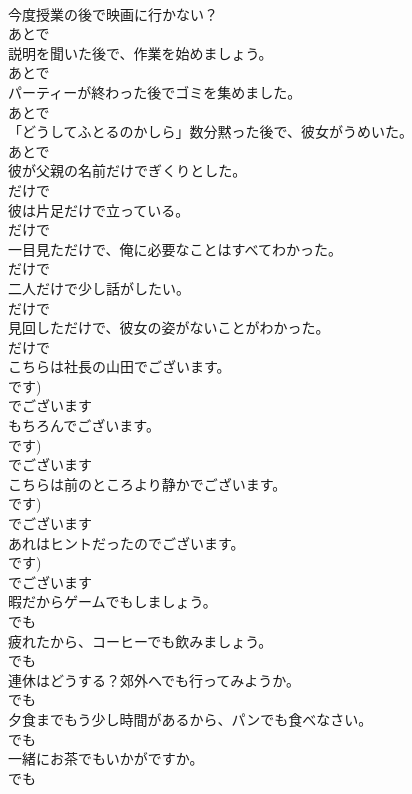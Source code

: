 \documentclass[8pt]{extreport}
\begin{document}
\begin{CJK}{UTF8}{min}
\\	今度授業の後で映画に行かない？	
\\	あとで	
\\	説明を聞いた後で、作業を始めましょう。	
\\	あとで	
\\	パーティーが終わった後でゴミを集めました。	
\\	あとで	
\\	「どうしてふとるのかしら」数分黙った後で、彼女がうめいた。	
\\	あとで	
\\	彼が父親の名前だけでぎくりとした。	
\\	だけで	
\\	彼は片足だけで立っている。	
\\	だけで	
\\	一目見ただけで、俺に必要なことはすべてわかった。	
\\	だけで	
\\	二人だけで少し話がしたい。	
\\	だけで	
\\	見回しただけで、彼女の姿がないことがわかった。	
\\	だけで	
\\	こちらは社長の山田でございます。	
\\	です)	
\\	でございます	
\\	もちろんでございます。	
\\	です)	
\\	でございます	
\\	こちらは前のところより静かでございます。	
\\	です)	
\\	でございます	
\\	あれはヒントだったのでございます。	
\\	です)	
\\	でございます	
\\	暇だからゲームでもしましょう。	
\\	でも	
\\	疲れたから、コーヒーでも飲みましょう。	
\\	でも	
\\	連休はどうする？郊外へでも行ってみようか。	
\\	でも	
\\	夕食までもう少し時間があるから、パンでも食べなさい。	
\\	でも	
\\	一緒にお茶でもいかがですか。	
\\	でも	

\end{CJK}
\end{document}
